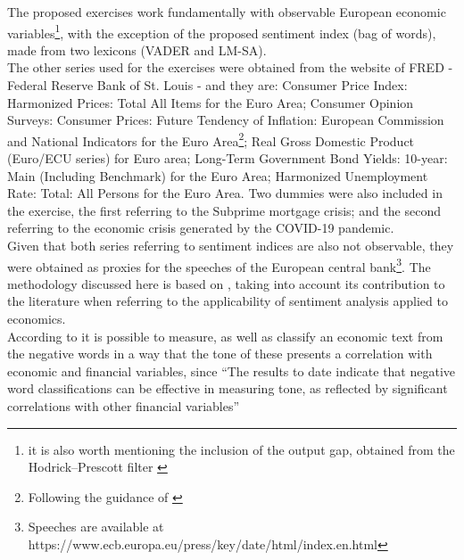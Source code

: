 The proposed exercises work fundamentally with observable European economic variables\footnote{it is also worth mentioning the inclusion of the output gap, obtained from the Hodrick–Prescott filter \citep{hodrick1997postwar}}, with the exception of the proposed sentiment index (bag of words), made from two lexicons (VADER and LM-SA).\\

The other series used for the exercises were obtained from the website of FRED - Federal Reserve Bank of St. Louis - and they are: Consumer Price Index: Harmonized Prices: Total All Items for the Euro Area; Consumer Opinion Surveys: Consumer Prices: Future Tendency of Inflation: European Commission and National Indicators for the Euro Area\footnote{Following the guidance of \cite{shapiro2020measuring}}; Real Gross Domestic Product (Euro/ECU series) for Euro area; Long-Term Government Bond Yields: 10-year: Main (Including Benchmark) for the Euro Area; Harmonized Unemployment Rate: Total: All Persons for the Euro Area. Two dummies were also included in the exercise, the first referring to the Subprime mortgage crisis; and the second referring to the economic crisis generated by the COVID-19 pandemic.\\


Given that both series referring to sentiment indices are also not observable, they were obtained as proxies for the speeches of the European central bank\footnote{Speeches are available at https://www.ecb.europa.eu/press/key/date/html/index.en.html}. The methodology discussed here is based on \cite{loughran2011liability}, taking into account its contribution to the literature when referring to the applicability of sentiment analysis applied to economics.\\

According to \cite[p. 35]{loughran2011liability} it is possible to measure, as well as classify an economic text from the negative words in a way that the tone of these presents a correlation with economic and financial variables, since ``The results to date indicate that negative word classifications can be effective in measuring tone, as reflected by significant correlations with other financial variables''\\

